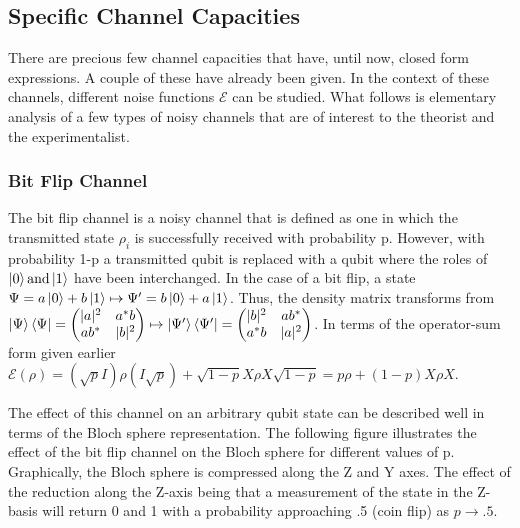 \documentclass[letterpaper,twoside,10pt]{article}
\begin{document}
\subsection{Specific Channel Capacities}
There are precious few channel capacities that have, until now, closed form expressions. A couple of these have already been given. In the context of these channels, different noise functions $\mathcal{E}$ can be studied. What follows is elementary analysis of a few types of noisy channels that are of interest to the theorist and the experimentalist.

\subsubsection{Bit Flip Channel}

The bit flip channel is a noisy channel that is defined as one in which the transmitted state $\rho_i$ is successfully received with probability p. However, with probability 1-p a transmitted qubit is replaced with a qubit where the roles of $\ket{0} \text{and} \ket{1}$ have been interchanged. In the case of a bit flip, a state $\Psi = a\ket{0}+b\ket{1} \mapsto \Psi'=b\ket{0}+a\ket{1}$. Thus, the density matrix transforms from $\ket{\Psi}\bra{\Psi}= \begin{pmatrix} |a|^2 & a^*b \\ ab^* & |b|^2 \end{pmatrix} \mapsto \ket{\Psi'}\bra{\Psi'}=\begin{pmatrix} |b|^2 & ab^* \\ a^*b & |a|^2 \end{pmatrix}$. In terms of the operator-sum form given earlier $\mathcal{E}(\rho) = (\sqrt p I)\rho (I\sqrt p)+\sqrt{1-p}X\rho X\sqrt{1-p} = p\rho + (1-p)X\rho X$.

The effect of this channel on an arbitrary qubit state can be described well in terms of the Bloch sphere representation. The following figure illustrates the effect of the bit flip channel on the Bloch sphere for different values of p. Graphically, the Bloch sphere is compressed along the Z and Y axes. The effect of the reduction along the Z-axis being that a measurement of the state in the Z-basis will return 0 and 1 with a probability approaching .5 (coin flip) as $p\rightarrow .5$.
\end{document}

